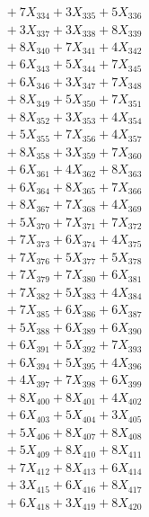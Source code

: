 \documentclass[a4paper,10pt]{article}
\begin{document}
{\begin{align}
&\;  + 7 X_{334} + 3 X_{335} + 5 X_{336} \\[0.3ex]
&\;  + 3 X_{337} + 3 X_{338} + 8 X_{339} \\[0.5ex]\allowbreak
&\;  + 8 X_{340} + 7 X_{341} + 4 X_{342} \\[0.3ex]
&\;  + 6 X_{343} + 5 X_{344} + 7 X_{345} \\[0.3ex]
&\;  + 6 X_{346} + 3 X_{347} + 7 X_{348} \\[0.3ex]
&\;  + 8 X_{349} + 5 X_{350} + 7 X_{351} \\[0.3ex]
&\;  + 8 X_{352} + 3 X_{353} + 4 X_{354} \\[0.3ex]
&\;  + 5 X_{355} + 7 X_{356} + 4 X_{357} \\[0.3ex]
&\;  + 8 X_{358} + 3 X_{359} + 7 X_{360} \\[0.3ex]
&\;  + 6 X_{361} + 4 X_{362} + 8 X_{363} \\[0.3ex]
&\;  + 6 X_{364} + 8 X_{365} + 7 X_{366} \\[0.3ex]
&\;  + 8 X_{367} + 7 X_{368} + 4 X_{369} \\[0.5ex]\allowbreak
&\;  + 5 X_{370} + 7 X_{371} + 7 X_{372} \\[0.3ex]
&\;  + 7 X_{373} + 6 X_{374} + 4 X_{375} \\[0.3ex]
&\;  + 7 X_{376} + 5 X_{377} + 5 X_{378} \\[0.3ex]
&\;  + 7 X_{379} + 7 X_{380} + 6 X_{381} \\[0.3ex]
&\;  + 7 X_{382} + 5 X_{383} + 4 X_{384} \\[0.3ex]
&\;  + 7 X_{385} + 6 X_{386} + 6 X_{387} \\[0.3ex]
&\;  + 5 X_{388} + 6 X_{389} + 6 X_{390} \\[0.3ex]
&\;  + 6 X_{391} + 5 X_{392} + 7 X_{393} \\[0.3ex]
&\;  + 6 X_{394} + 5 X_{395} + 4 X_{396} \\[0.3ex]
&\;  + 4 X_{397} + 7 X_{398} + 6 X_{399} \\[0.5ex]\allowbreak
&\;  + 8 X_{400} + 8 X_{401} + 4 X_{402} \\[0.3ex]
&\;  + 6 X_{403} + 5 X_{404} + 3 X_{405} \\[0.3ex]
&\;  + 5 X_{406} + 8 X_{407} + 8 X_{408} \\[0.3ex]
&\;  + 5 X_{409} + 8 X_{410} + 8 X_{411} \\[0.3ex]
&\;  + 7 X_{412} + 8 X_{413} + 6 X_{414} \\[0.3ex]
&\;  + 3 X_{415} + 6 X_{416} + 8 X_{417} \\[0.3ex]
&\;  + 6 X_{418} + 3 X_{419} + 8 X_{420} \\[0.3ex]

\end{align}}
\end{document}
